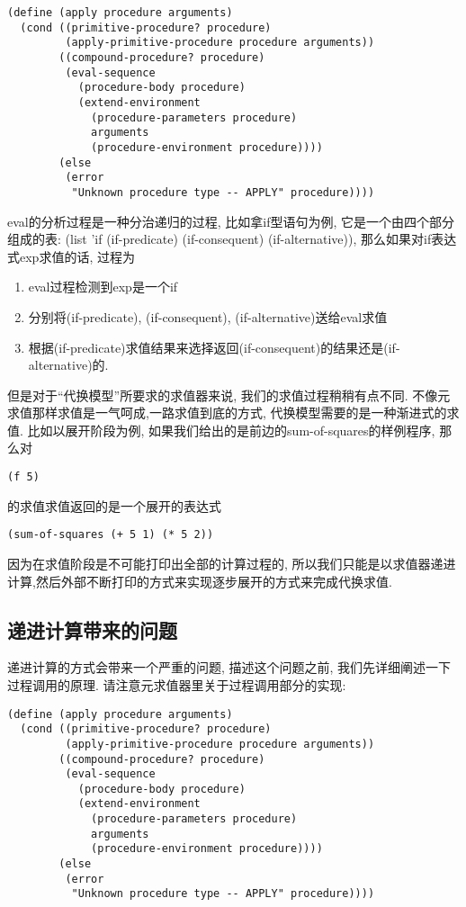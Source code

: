 \documentclass{article}
\begin{document}
\begin{CJK*}{UTF8}{gkai}
\begin{lstlisting}
(define (apply procedure arguments)
  (cond ((primitive-procedure? procedure)
         (apply-primitive-procedure procedure arguments))
        ((compound-procedure? procedure)
         (eval-sequence
           (procedure-body procedure)
           (extend-environment
             (procedure-parameters procedure)
             arguments
             (procedure-environment procedure))))
        (else
         (error
          "Unknown procedure type -- APPLY" procedure))))
\end{lstlisting}

eval的分析过程是一种分治递归的过程, 比如拿if型语句为例, 它是一个由四个部分组成的表: (list 'if (if-predicate) (if-consequent) (if-alternative)), 那么如果对if表达式exp求值的话, 过程为

\begin{enumerate}
    \item eval过程检测到exp是一个if
    \item 分别将(if-predicate), (if-consequent), (if-alternative)送给eval求值
    \item 根据(if-predicate)求值结果来选择返回(if-consequent)的结果还是(if-alternative)的.
\end{enumerate}

但是对于``代换模型''所要求的求值器来说, 我们的求值过程稍稍有点不同. 不像元求值那样求值是一气呵成,一路求值到底的方式, 代换模型需要的是一种渐进式的求值. 比如以展开阶段为例, 如果我们给出的是前边的sum-of-squares的样例程序, 那么对

\begin{lstlisting}[numbers=none]
(f 5)
\end{lstlisting}

的求值求值返回的是一个展开的表达式

\begin{lstlisting}[numbers=none]
(sum-of-squares (+ 5 1) (* 5 2))
\end{lstlisting}

因为在求值阶段是不可能打印出全部的计算过程的, 所以我们只能是以求值器递进计算,然后外部不断打印的方式来实现逐步展开的方式来完成代换求值.


\subsection{递进计算带来的问题}

递进计算的方式会带来一个严重的问题, 描述这个问题之前, 我们先详细阐述一下过程调用的原理. 请注意元求值器里关于过程调用部分的实现:

\begin{lstlisting}
(define (apply procedure arguments)
  (cond ((primitive-procedure? procedure)
         (apply-primitive-procedure procedure arguments))
        ((compound-procedure? procedure)
         (eval-sequence
           (procedure-body procedure)
           (extend-environment
             (procedure-parameters procedure)
             arguments
             (procedure-environment procedure))))
        (else
         (error
          "Unknown procedure type -- APPLY" procedure))))
\end{lstlisting}


\end{CJK*}
\end{document}
